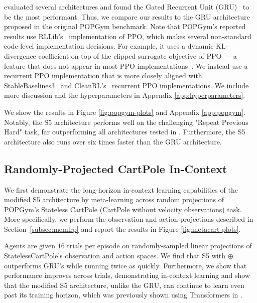 \documentclass{article}
\newcommand{\newop}{\oplus}
\begin{document}
\citet{morad2023popgym} evaluated several architectures and found the Gated Recurrent Unit (GRU)~\citep{cho2014learning} to be the most performant. Thus, we compare our results to the GRU architecture proposed in the original POPGym benchmark. Note that POPGym's reported results use RLLib's~\citep{liang2018rllib} implementation of PPO, which makes several non-standard code-level implementation decisions. For example, it uses a dynamic KL-divergence coefficient on top of the clipped surrogate objective of PPO~\citep{ppo} -- a feature that does not appear in most PPO implementations~\citep{engstrom2020implementation}. 
We instead use a recurrent PPO implementation that is more closely aligned with StableBaselines3~\citep{stable-baselines3} and CleanRL's~\citep{huang2022cleanrl} recurrent PPO implementations. We include more discussion and the hyperparameters in Appendix \ref{app:hyperparameters}.

We show the results in Figure \ref{fig:popgym-plots} and Appendix \ref{app:popgym}. Notably, the S5 architecture performs well on the challenging "Repeat Previous Hard" task, far outperforming all architectures tested in \citet{morad2023popgym}. Furthermore, the S5 architecture also runs over six times faster than the GRU architecture. 

\subsection{Randomly-Projected CartPole In-Context}

We first demonstrate the long-horizon in-context learning capabilities of the modified S5 architecture by meta-learning across random projections of POPGym's Stateless CartPole (CartPole without velocity observations) task. More specifically, we perform the observation and action projections described in Section~\ref{subsec:memlrp} and report the results in Figure \ref{fig:metacart-plots}. 

Agents are given $16$ trials per episode on randomly-sampled linear projections of StatelessCartPole's observation and action spaces. We find that S5 with $\newop$ outperforms GRU's while running twice as quickly. Furthermore, we show that performance improves across trials, demonstrating in-context learning and show that the modified S5 architecture, unlike the GRU, can continue to learn even past its training horizon, which was previously shown using Transformers in \citet{ada2023ada}. 
\end{document}
